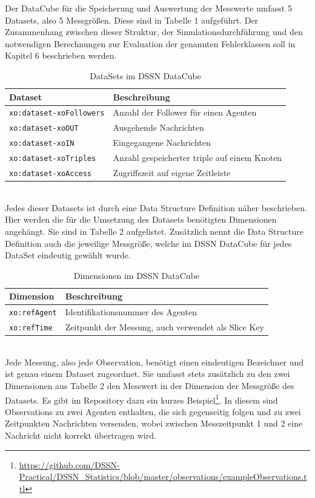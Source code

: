 \documentclass{article}
\begin{document}
Der DataCube für die Speicherung und Auswertung der Messwerte umfasst 5 Datasets, also 5 Messgrößen. Diese sind in Tabelle 1 aufgeführt. Der Zusammenhang zwischen dieser Struktur, der Simulationsdurchführung und den notwendigen Berechnungen zur Evaluation der genannten Fehlerklassen soll in Kapitel 6 beschrieben werden.
\begin{table}[ht]
\centering
\label{table1}
\begin{tabular}{|l|l|}
\hline
Dataset & Beschreibung \\ \hline
\texttt{xo:dataset-xoFollowers}       & Anzahl der Follower für einen Agenten            	\\ \hline
\texttt{xo:dataset-xoOUT}        & Ausgehende Nachrichten         \\ \hline
\texttt{xo:dataset-xoIN}        & Eingegangene Nachrichten             						\\ \hline
\texttt{xo:dataset-xoTriples}        & Anzahl gespeicherter triple auf einem Knoten        	\\ \hline
\texttt{xo:dataset-xoAccess}        & Zugriffszeit auf eigene Zeitleiste             		\\ \hline
\end{tabular}
\caption{DataSets im DSSN DataCube}
\end{table}\\
Jedes dieser Datasets ist durch eine Data Structure Definition näher beschrieben. Hier werden die für die Umsetzung des Datasets benötigten Dimensionen angehängt. Sie sind in Tabelle 2 aufgelistet. Zusätzlich nennt die Data Structure Definition auch die jeweilige Messgröße, welche im DSSN DataCube für jedes DataSet eindeutig gewählt wurde.
\begin{table}[t]
\centering
\label{table2}
\begin{tabular}{|l|l|}
\hline
Dimension & Beschreibung \\ \hline
\texttt{xo:refAgent}       & Identifikationsnummer des Agenten            			\\ \hline
\texttt{xo:refTime}        & Zeitpunkt der Messung, auch verwendet als Slice Key	\\ \hline
\end{tabular}
\caption{Dimensionen im DSSN DataCube}
\end{table}\\
Jede Messung, also jede Observation, benötigt einen eindeutigen Bezeichner und ist genau einem Dataset zugeordnet. Sie umfasst stets zusätzlich zu den zwei Dimensionen aus Tabelle 2 den Messwert in der Dimension der Messgröße des Datasets. Es gibt im Repository dazu ein kurzes Beispiel\footnote{\url{https://github.com/DSSN-Practical/DSSN_Statistics/blob/master/observations/exampleObservations.ttl}}. In diesem sind Observations zu zwei Agenten enthalten, die sich gegenseitig folgen und zu zwei Zeitpunkten Nachrichten versenden, wobei zwischen Messzeitpunkt 1 und 2 eine Nachricht nicht korrekt übertragen wird.
\end{document}
